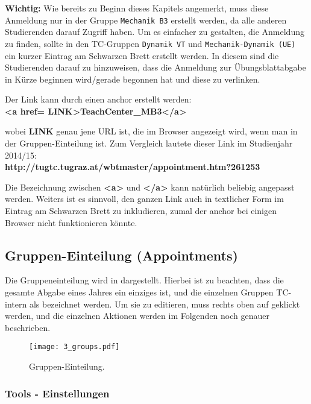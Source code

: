{\bf Wichtig:}
Wie bereits zu Beginn dieses Kapitels angemerkt, muss diese Anmeldung nur in
der Gruppe {\tt Mechanik B3} erstellt werden, da alle anderen Studierenden
darauf Zugriff haben. Um es einfacher zu gestalten, die Anmeldung
zu finden, sollte in den TC-Gruppen {\tt Dynamik VT} und 
{\tt Mechanik-Dynamik (UE)} ein kurzer Eintrag am Schwarzen Brett erstellt 
werden. In diesem sind die Studierenden darauf zu hinzuweisen, dass die 
Anmeldung zur Übungsblattabgabe in Kürze beginnen wird/gerade begonnen hat und 
diese zu verlinken.

Der Link kann durch einen anchor erstellt werden:\\
{\bf
<a href= \grqq{}LINK\grqq{}>TeachCenter\_MB3</a>
}

wobei \textbf{LINK} genau jene URL ist, die im Browser angezeigt wird, wenn
man in der Gruppen-Einteilung ist. Zum Vergleich lautete dieser Link
im Studienjahr 2014/15:\\
{\bf http://tugtc.tugraz.at/wbtmaster/appointment.htm?261253 }

Die Bezeichnung zwischen {\bf <a>} und  {\bf </a>} kann natürlich beliebig
angepasst werden. Weiters ist es sinnvoll, den ganzen Link auch
in textlicher Form im Eintrag am Schwarzen Brett zu inkludieren, zumal
der anchor bei einigen Browser nicht funktionieren könnte.


\subsection{Gruppen-Einteilung (Appointments)}

Die Gruppeneinteilung wird in  dargestellt. Hierbei ist zu
beachten, dass die gesamte Abgabe eines Jahres ein einziges 
ist, und die einzelnen Gruppen TC-intern als  bezeichnet werden.
Um sie zu editieren, muss rechts oben auf  geklickt werden, und
die einzelnen Aktionen werden im Folgenden noch genauer beschrieben.

\begin{figure}[htbp]
\begin{center}
  \texttt{[image: 3\_groups.pdf]}
  \caption{ Gruppen-Einteilung.}
  \label{fig:groups}
\end{center}
\end{figure}

\subsubsection{Tools - Einstellungen}

